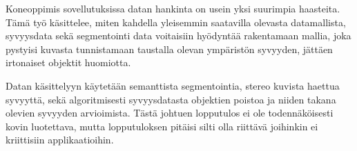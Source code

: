 
Koneoppimis sovellutuksissa datan hankinta on usein yksi suurimpia haasteita. Tämä työ käsittelee, miten kahdella yleisemmin saatavilla olevasta datamallista, syvyysdata sekä segmentointi data voitaisiin hyödyntää rakentamaan mallia, joka pystyisi kuvasta tunnistamaan taustalla olevan ympäristön syvyyden, jättäen irtonaiset objektit huomiotta.

Datan käsittelyyn käytetään semanttista segmentointia, stereo kuvista haettua syvyyttä, sekä algoritmisesti syvyysdatasta objektien poistoa ja niiden takana olevien syvyyden arvioimista. Tästä johtuen lopputulos ei ole todennäköisesti kovin luotettava, mutta lopputuloksen pitäisi silti olla riittävä joihinkin ei kriittisiin applikaatioihin.
